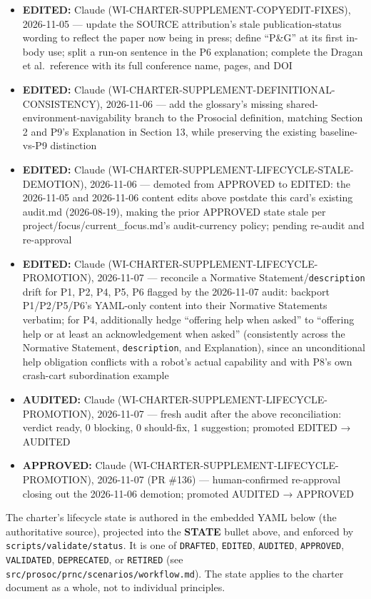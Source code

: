 \documentclass[utf8]{frontiers_suppmat} %
\begin{document}
\begin{itemize}
  revert
\item
  \textbf{EDITED:} Claude (WI-CHARTER-SUPPLEMENT-COPYEDIT-FIXES),
  2026-11-05 --- update the SOURCE attribution's stale
  publication-status wording to reflect the paper now being in press;
  define ``P\&G'' at its first in-body use; split a run-on sentence in
  the P6 explanation; complete the Dragan et al.~reference with its full
  conference name, pages, and DOI
\item
  \textbf{EDITED:} Claude
  (WI-CHARTER-SUPPLEMENT-DEFINITIONAL-CONSISTENCY), 2026-11-06 --- add
  the glossary's missing shared-environment-navigability branch to the
  Prosocial definition, matching Section 2 and P9's Explanation in
  Section 13, while preserving the existing baseline-vs-P9 distinction
\item
  \textbf{EDITED:} Claude
  (WI-CHARTER-SUPPLEMENT-LIFECYCLE-STALE-DEMOTION), 2026-11-06 ---
  demoted from APPROVED to EDITED: the 2026-11-05 and 2026-11-06 content
  edits above postdate this card's existing audit.md (2026-08-19),
  making the prior APPROVED state stale per
  project/focus/current\_focus.md's audit-currency policy; pending
  re-audit and re-approval
\item
  \textbf{EDITED:} Claude (WI-CHARTER-SUPPLEMENT-LIFECYCLE-PROMOTION),
  2026-11-07 --- reconcile a Normative
  Statement/\texttt{description} drift for P1, P2, P4,
  P5, P6 flagged by the 2026-11-07 audit: backport P1/P2/P5/P6's
  YAML-only content into their Normative Statements verbatim; for P4,
  additionally hedge ``offering help when asked'' to ``offering help or
  at least an acknowledgement when asked'' (consistently across the
  Normative Statement, \texttt{description}, and
  Explanation), since an unconditional help obligation conflicts with a
  robot's actual capability and with P8's own crash-cart subordination
  example
\item
  \textbf{AUDITED:} Claude (WI-CHARTER-SUPPLEMENT-LIFECYCLE-PROMOTION),
  2026-11-07 --- fresh audit after the above reconciliation: verdict
  ready, 0 blocking, 0 should-fix, 1 suggestion; promoted EDITED →
  AUDITED
\item
  \textbf{APPROVED:} Claude (WI-CHARTER-SUPPLEMENT-LIFECYCLE-PROMOTION),
  2026-11-07 (PR \#136) --- human-confirmed re-approval closing out the
  2026-11-06 demotion; promoted AUDITED → APPROVED
\end{itemize}

The charter's lifecycle state is authored in the embedded YAML below
(the authoritative source), projected into the \textbf{STATE} bullet
above, and enforced by
\texttt{scripts/validate/status}. It is one of
\texttt{DRAFTED}, \texttt{EDITED},
\texttt{AUDITED}, \texttt{APPROVED},
\texttt{VALIDATED},
\texttt{DEPRECATED}, or
\texttt{RETIRED} (see
\texttt{src/prosoc/prnc/scenarios/workflow.md}). The
state applies to the charter document as a whole, not to individual
principles.
\end{document}
